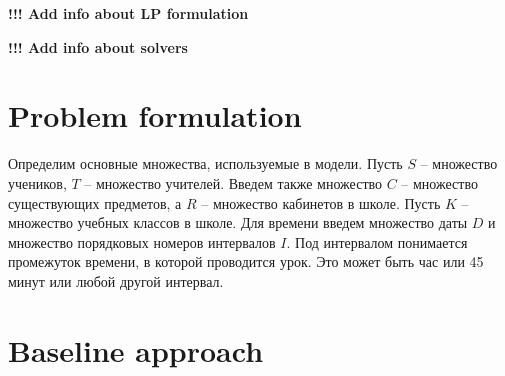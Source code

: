 \documentclass{article}
\begin{document}
\textbf{!!! Add info about LP formulation}

\textbf{!!! Add info about solvers}

\section{Problem formulation}

Определим основные множества, используемые в модели. Пусть $S$ -- множество учеников, $T$ -- множество учителей. Введем также множество $C$ -- множество существующих предметов, а $R$ -- множество кабинетов в школе. Пусть $K$ -- множество учебных классов в школе. Для времени введем множество даты $D$ и множество порядковых номеров интервалов $I$. Под интервалом понимается промежуток времени, в которой проводится урок. Это может быть час или 45 минут или любой другой интервал.

\section{Baseline approach}





\end{document}
